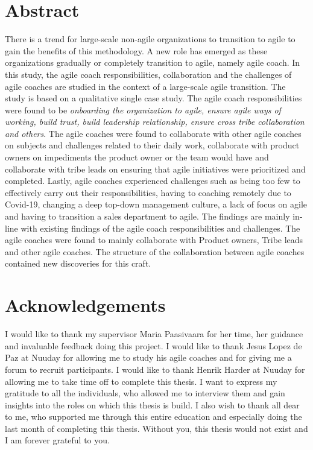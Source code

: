 \documentclass[11pt,a4paper]{report}
\begin{document}
\section*{Abstract}
There is a trend for large-scale non-agile organizations to transition to agile to gain the benefits of this methodology. A new role has emerged as these organizations gradually or completely transition to agile, namely agile coach. In this study, the agile coach responsibilities, collaboration and the challenges of agile coaches are studied in the context of a large-scale agile transition. The study is based on a qualitative single case study. 
The agile coach responsibilities were found to be \emph{onboarding the organization to agile, ensure agile ways of working, build trust, build leadership relationship, ensure cross tribe collaboration and others}. The agile coaches were found to collaborate with other agile coaches on subjects and challenges related to their daily work, collaborate with product owners on impediments the product owner or the team would have and collaborate with tribe leads on ensuring that agile initiatives were prioritized and completed. Lastly, agile coaches experienced challenges such as being too few to effectively carry out their responsibilities, having to coaching remotely due to Covid-19, changing a deep top-down management culture, a lack of focus on agile and having to transition a sales department to agile.
The findings are mainly in-line with existing findings of the agile coach responsibilities and challenges. The agile coaches were found to mainly collaborate with Product owners, Tribe leads and other agile coaches. The structure of the collaboration between agile coaches contained new discoveries for this craft.

\newpage
\section*{Acknowledgements}
I would like to thank my supervisor Maria Paasivaara for her time, her guidance and invaluable feedback doing this project. I would like to thank Jesus Lopez de Paz at Nuuday for allowing me to study his agile coaches and for giving me a forum to recruit participants. I would like to thank Henrik Harder at Nuuday for allowing me to take time off to complete this thesis. I want to express my gratitude to all the individuals, who allowed me to interview them and gain insights into the roles on which this thesis is build.
\newline
\newline
\noindent I also wish to thank all dear to me, who supported me through this entire education and especially doing the last month of completing this thesis. Without you, this thesis would not exist and I am forever grateful to you.
\end{document}
